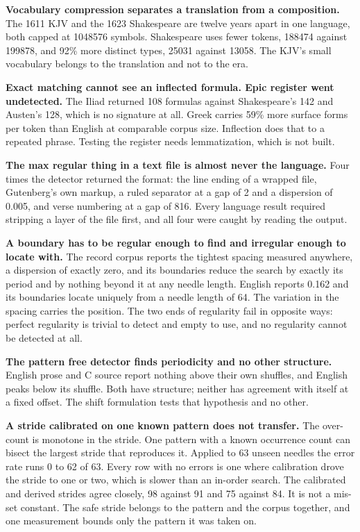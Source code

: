 \textbf{Vocabulary compression separates a translation from a composition.} The 1611 KJV and the 1623 Shakespeare are twelve years apart in one language, both capped at 1048576 symbols. Shakespeare uses fewer tokens, 188474 against 199878, and 92\% more distinct types, 25031 against 13058. The KJV's small vocabulary belongs to the translation and not to the era.

\textbf{Exact matching cannot see an inflected formula. Epic register went undetected.} The Iliad returned 108 formulas against Shakespeare's 142 and Austen's 128, which is no signature at all. Greek carries 59\% more surface forms per token than English at comparable corpus size. Inflection does that to a repeated phrase. Testing the register needs lemmatization, which is not built.

\textbf{The max regular thing in a text file is almost never the language.} Four times the detector returned the format: the line ending of a wrapped file, Gutenberg's own markup, a ruled separator at a gap of 2 and a dispersion of 0.005, and verse numbering at a gap of 816. Every language result required stripping a layer of the file first, and all four were caught by reading the output.

\textbf{A boundary has to be regular enough to find and irregular enough to locate with.} The record corpus reports the tightest spacing measured anywhere, a dispersion of exactly zero, and its boundaries reduce the search by exactly its period and by nothing beyond it at any needle length. English reports 0.162 and its boundaries locate uniquely from a needle length of 64. The variation in the spacing carries the position. The two ends of regularity fail in opposite ways: perfect regularity is trivial to detect and empty to use, and no regularity cannot be detected at all.

\textbf{The pattern free detector finds periodicity and no other structure.} English prose and C source report nothing above their own shuffles, and English peaks below its shuffle. Both have structure; neither has agreement with itself at a fixed offset. The shift formulation tests that hypothesis and no other.

\textbf{A stride calibrated on one known pattern does not transfer.} The over-count is monotone in the stride. One pattern with a known occurrence count can bisect the largest stride that reproduces it. Applied to 63 unseen needles the error rate runs 0 to 62 of 63. Every row with no errors is one where calibration drove the stride to one or two, which is slower than an in-order search. The calibrated and derived strides agree closely, 98 against 91 and 75 against 84. It is not a mis-set constant. The safe stride belongs to the pattern and the corpus together, and one measurement bounds only the pattern it was taken on.

